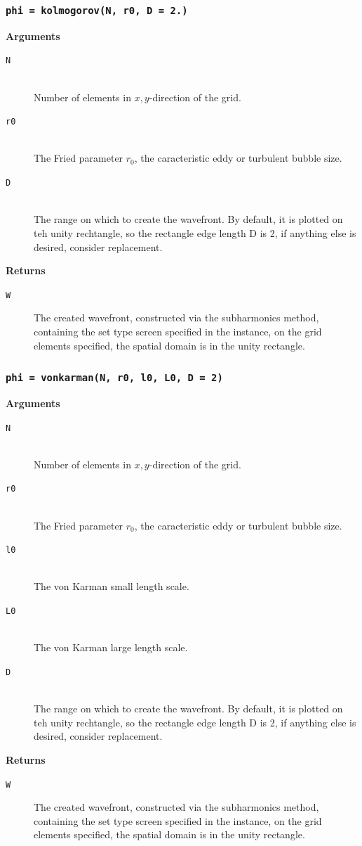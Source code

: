 \documentclass{article}
\begin{document}
\newpage
\subsubsection*{\texttt{phi = kolmogorov(N, r0, D = 2.)}}
\textbf{Arguments}
\begin{description}
  \item[\texttt{N}] \hfill \\
  Number of elements in $x,y$-direction of the grid.
  \item[\texttt{r0}] \hfill \\
  The Fried parameter $r_0$, the caracteristic eddy or turbulent bubble size.
  \item[\texttt{D}] \hfill \\
 	The range on which to create the wavefront. By default, it is plotted on teh unity rechtangle, so the rectangle edge length D is 2, if anything else is desired, consider replacement.  
\end{description}
\textbf{Returns}
\begin{description}
	\item[\texttt{W}]
	The created wavefront, constructed via the subharmonics method, containing the set type screen specified in the instance, on the grid elements specified, the spatial domain is in the unity rectangle.
\end{description}

\newpage
\subsubsection*{\texttt{phi = vonkarman(N, r0, l0, L0, D = 2)}}
\textbf{Arguments}
\begin{description}
  \item[\texttt{N}] \hfill \\
  Number of elements in $x,y$-direction of the grid.
  \item[\texttt{r0}] \hfill \\
  The Fried parameter $r_0$, the caracteristic eddy or turbulent bubble size.
  \item[\texttt{l0}] \hfill \\
  The von Karman small length scale.
  \item[\texttt{L0}] \hfill \\
  The von Karman large length scale.
  \item[\texttt{D}] \hfill \\
 	The range on which to create the wavefront. By default, it is plotted on teh unity rechtangle, so the rectangle edge length D is 2, if anything else is desired, consider replacement. 
\end{description}
\textbf{Returns}
\begin{description}
	\item[\texttt{W}]
	The created wavefront, constructed via the subharmonics method, containing the set type screen specified in the instance, on the grid elements specified, the spatial domain is in the unity rectangle.
\end{description}
\end{document}
